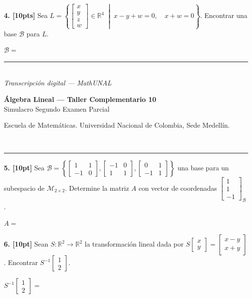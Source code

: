 \documentclass[11pt]{article}
\newcommand{\examheader}{%
  \noindent
  \begin{minipage}[t]{0.6\linewidth}
    {\small\bfseries Álgebra Lineal --- Taller Complementario 10}\\
    {\small Simulacro Segundo Examen Parcial}
  \end{minipage}%
  \hfill
  \begin{minipage}[t]{0.35\linewidth}
    \raggedleft\small Escuela de Matemáticas. Universidad Nacional de Colombia, Sede Medellín.
  \end{minipage}\\[2pt]
  \rule{\linewidth}{0.6pt}
}
\newcommand{\examfooter}{%
  \vfill
  \rule{\linewidth}{0.4pt}\\[1pt]
  {\scriptsize\textit{Transcripción digital --- MathUNAL}\hfill\textcolor{unalblue}{\textbf{\thepage}}}
}
\begin{document}
\vspace{1.5cm}

\textbf{4. [10pts]} Sea $L = \left\{ \begin{bmatrix}x\\y\\z\\w\end{bmatrix} \in \mathbb{R}^4 \;\middle|\; x-y+w=0,\quad x+w=0 \right\}$. Encontrar una base $\mathcal{B}$ para $L$.

\vspace{0.3cm}
\noindent $\mathcal{B} = $

\examfooter
\newpage

\examheader

\textbf{5. [10pt]} Sea $\mathcal{B} = \left\{ \begin{bmatrix}1&1\\-1&0\end{bmatrix}, \begin{bmatrix}-1&0\\1&1\end{bmatrix}, \begin{bmatrix}0&1\\-1&1\end{bmatrix} \right\}$ una base para un subespacio de $\mathcal{M}_{2\times 2}$. Determine la matriz $A$ con vector de coordenadas $\begin{bmatrix}1\\1\\-1\end{bmatrix}_{\mathcal{B}}$.

\vspace{0.3cm}
\noindent $A = $

\vspace{1.5cm}

\textbf{6. [10pt]} Sean $S:\mathbb{R}^2 \to \mathbb{R}^2$ la transformación lineal dada por $S\begin{bmatrix}x\\y\end{bmatrix} = \begin{bmatrix}x-y\\x+y\end{bmatrix}$. Encontrar $S^{-1}\begin{bmatrix}1\\2\end{bmatrix}$.

\vspace{0.3cm}
\noindent $S^{-1}\begin{bmatrix}1\\2\end{bmatrix} = $
\end{document}
